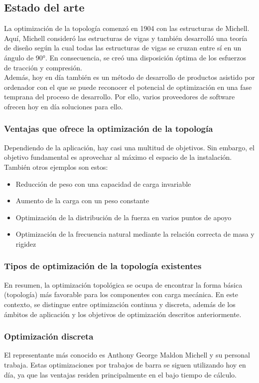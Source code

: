 \documentclass{article}
\begin{document}
\subsection{Estado del arte}
La optimización de la topología comenzó en 1904 con las estructuras de Michell. Aquí, Michell consideró las estructuras de vigas y también desarrolló una teoría de diseño según la cual todas las estructuras de vigas se cruzan entre sí en un ángulo de 90°. En consecuencia, se creó una disposición óptima de los esfuerzos de tracción y compresión. \\
Además, hoy en día también es un método de desarrollo de productos asistido por ordenador con el que se puede reconocer el potencial de optimización en una fase temprana del proceso de desarrollo. Por ello, varios proveedores de software ofrecen hoy en día soluciones para ello. \\
\subsubsection{Ventajas que ofrece la optimización de la topología}
Dependiendo de la aplicación, hay casi una multitud de objetivos. Sin embargo, el objetivo fundamental es aprovechar al máximo el espacio de la instalación.
También otros ejemplos son estos: 
\begin{itemize}
  \item Reducción de peso con una capacidad de carga invariable
  \item	Aumento de la carga con un peso constante 
  \item Optimización de la distribución de la fuerza en varios puntos de apoyo \item Optimización de la frecuencia natural mediante la relación correcta de       masa y rigidez
\end{itemize}
\subsubsection{Tipos de optimización de la topología existentes}
En resumen, la optimización topológica se ocupa de encontrar la forma básica (topología) más favorable para los componentes con carga mecánica. En este contexto, se distingue entre optimización continua y discreta, además de los ámbitos de aplicación y los objetivos de optimización descritos anteriormente.
\subsubsection{Optimización discreta}
El representante más conocido es Anthony George Maldon Michell y su personal trabaja. Estas optimizaciones por trabajos de barra se siguen utilizando hoy en día, ya que las ventajas residen principalmente en el bajo tiempo de cálculo. 
\end{document}
